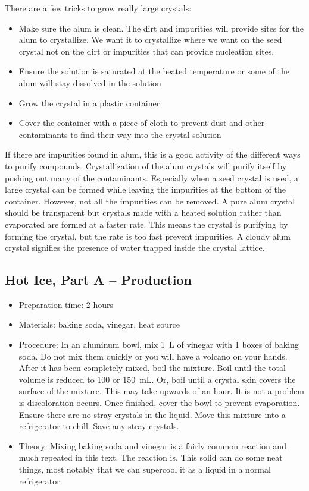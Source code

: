 \begin{itemize}
{There are a few tricks to grow really large crystals:
\begin{itemize}
\item{Make sure the alum is clean. The dirt and impurities will provide sites for the alum to crystallize. We want it to crystallize where we want on the seed crystal not on the dirt or impurities that can provide nucleation sites.}
\item{Ensure the solution is saturated at the heated temperature or some of the alum will stay dissolved in the solution}
\item{Grow the crystal in a plastic container}
\item{Cover the container with a piece of cloth to prevent dust and other contaminants to find their way into the crystal solution}
\end{itemize}
If there are impurities found in alum, this is a good activity of the different ways to purify compounds. Crystallization of the alum crystals will purify itself by pushing out many of the contaminants. Especially when a seed crystal is used, a large crystal can be formed while leaving the impurities at the bottom of the container. However, not all the impurities can be removed. A pure alum crystal should be transparent but crystals made with a heated solution rather than evaporated are formed at a faster rate. This means the crystal is purifying by forming the crystal, but the rate is too fast prevent impurities. A cloudy alum crystal signifies the presence of water trapped inside the crystal lattice. }
\end{itemize}

\subsection{Hot Ice, Part A -- Production}
\begin{itemize}
\item{Preparation time: 2 hours}
\item{Materials: baking soda, vinegar, heat source}
\item{Procedure: In an aluminum bowl, mix 1~L of vinegar with 1 boxes of baking soda. Do not mix them quickly or you will have a volcano on your hands. After it has been completely mixed, boil the mixture. Boil until the total volume is reduced to 100 or 150~mL. Or, boil until a crystal skin covers the surface of the mixture. This may take upwards of an hour. It is not a problem is discoloration occurs. Once finished, cover the bowl to prevent evaporation. Ensure there are no stray crystals in the liquid. Move this mixture into a refrigerator to chill. Save any stray crystals.}
\item{Theory: Mixing baking soda and vinegar is a fairly common reaction and much repeated in this text. The reaction is. This solid can do some neat things, most notably that we can supercool it as a liquid in a normal refrigerator.}
\end{itemize}

